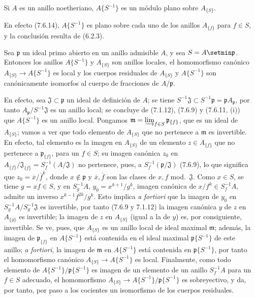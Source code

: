 \begin{proposition}[7.6.16]
\label{0.7.6.16-fr}
Si $A$ es un anillo noetheriano, $A\{S^{-1}\}$ es un módulo plano sobre
$A_{\{S\}}$.
\end{proposition}

En efecto (7.6.14), $A\{S^{-1}\}$ es plano sobre cada uno de los anillos
$A_{\{f\}}$ para $f\in S$, y la conclusión resulta de (6.2.3).

\begin{proposition}[7.6.17]
\label{0.7.6.17-fr}
Sea $\mathfrak p$ un ideal primo abierto en un anillo admisible $A$, y
sea $S=A\setmin\mathfrak p$. Entonces los anillos $A\{S^{-1}\}$ y $A_{\{S\}}$ son
anillos locales, el homomorfismo canónico
$A_{\{S\}}\to A\{S^{-1}\}$ es local y los cuerpos residuales de $A_{\{S\}}$
y $A\{S^{-1}\}$ son canónicamente isomorfos al cuerpo de fracciones de
$A/\mathfrak p$.
\end{proposition}

En efecto, sea $\mathfrak J\subset\mathfrak p$ un ideal de definición de
$A$; se tiene $S^{-1}\mathfrak J\subset S^{-1}\mathfrak p=\mathfrak p
A_{\mathfrak p}$, por tanto $A_{\mathfrak p}/S^{-1}\mathfrak J$ es un anillo
local; se concluye de (7.1.12), (7.6.9) y (7.6.11, (i)) que
$A\{S^{-1}\}$ es un anillo local. Pongamos
$\mathfrak m=\varinjlim_{f\in S}\mathfrak p_{\{f\}}$, que es un ideal de
$A_{\{S\}}$; vamos a ver que todo elemento de $A_{\{S\}}$ que no pertenece
a $\mathfrak m$ es invertible. En efecto, tal elemento es la imagen en
$A_{\{S\}}$ de un elemento $z\in A_{\{f\}}$ que no pertenece a
$\mathfrak p_{\{f\}}$, para un $f\in S$; su imagen canónica $z_0$ en
$A_{\{f\}}/\mathfrak J_{\{f\}}=S_f^{-1}(A/\mathfrak J)$ no pertenece, pues,
a $S_f^{-1}(\mathfrak p/\mathfrak J)$ (7.6.9), lo que significa que
$z_0=\overline{x}/\overline{f}^k$, donde $x\notin\mathfrak p$ y
$\overline{x},\overline{f}$ son las clases de $x,f$ mod.~$\mathfrak J$.
Como $x\in S$, se tiene $g=xf\in S$, y en $S_g^{-1}A$,
$y_0=x^{k+1}/g^k$, imagen canónica de $x/f^k\in S_f^{-1}A$, admite un
inverso $x^{k-1}f^{2k}/g^k$. Esto implica \emph{a fortiori} que la imagen de
$y_0$ en $S_g^{-1}A/S_g^{-1}\mathfrak J$ es invertible, por tanto (7.6.9 y
7.1.12) la imagen canónica $y$ de $z$ en $A_{\{g\}}$ es invertible;
la imagen de $z$ en $A_{\{S\}}$ (igual a la de $y$) es, por consiguiente,
invertible. Se ve, pues, que $A_{\{S\}}$ es un anillo local de ideal maximal
$\mathfrak m$; además, la imagen de $\mathfrak p_{\{f\}}$ en
$A\{S^{-1}\}$ está contenida en el ideal maximal $\mathfrak p\{S^{-1}\}$ de
este anillo; \emph{a fortiori}, la imagen de $\mathfrak m$ en
$A\{S^{-1}\}$ está contenida en $\mathfrak p\{S^{-1}\}$, por tanto
el homomorfismo canónico $A_{\{S\}}\to A\{S^{-1}\}$ es local. Finalmente,
como todo elemento de $A\{S^{-1}\}/\mathfrak p\{S^{-1}\}$ es imagen de un
elemento de un anillo $S_f^{-1}A$ para un $f\in S$ adecuado,
el homomorfismo $A_{\{S\}}\to A\{S^{-1}\}/\mathfrak p\{S^{-1}\}$ es
sobreyectivo, y da, por tanto, por paso a los cocientes un isomorfismo de los cuerpos
residuales.

